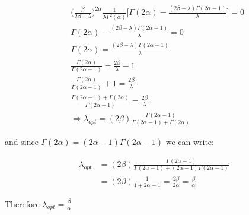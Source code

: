 \documentclass{article}
\begin{document}
\begin{align*}
&\Bigg( \frac{\beta}{ 2 \beta - \lambda} \Bigg)^{2 \alpha} \frac{1}{\lambda \Gamma^{2}(\alpha)} \Bigg[ \Gamma(2 \alpha) - \frac{(2\beta-\lambda)\Gamma(2\alpha-1)}{\lambda} \Bigg] = 0 \\
&\Gamma(2 \alpha) - \frac{(2\beta - \lambda) \Gamma(2 \alpha - 1)}{\lambda} = 0 \\
&\Gamma(2 \alpha) = \frac{(2\beta - \lambda) \Gamma(2 \alpha - 1)}{\lambda} \\
&\frac{\Gamma(2 \alpha)}{\Gamma(2 \alpha - 1)} = \frac{2 \beta}{\lambda} - 1 \\
&\frac{\Gamma(2 \alpha)}{\Gamma(2 \alpha - 1)} + 1 = \frac{2 \beta}{\lambda} \\
&\frac{ \Gamma(2 \alpha - 1) + \Gamma(2 \alpha) }{\Gamma(2 \alpha - 1)} = \frac{2\beta}{\lambda} \\
&\Rightarrow \lambda_{opt} = (2 \beta) \frac{\Gamma(2 \alpha - 1)}{ \Gamma(2 \alpha - 1) + \Gamma(2 \alpha) }
\end{align*}

and since $\Gamma(2 \alpha) = (2 \alpha - 1) \Gamma(2 \alpha - 1)$ we can write:

\begin{align*}
\lambda_{opt} &=  (2 \beta) \frac{\Gamma(2 \alpha - 1)}{ \Gamma(2 \alpha - 1) +  (2 \alpha - 1) \Gamma(2 \alpha - 1) } \\
&= (2 \beta) \frac{1}{1 + 2 \alpha - 1} = \frac{2 \beta}{2 \alpha} = \frac{\beta}{\alpha}
\end{align*}

Therefore $\lambda_{opt} = \frac{\beta}{\alpha}$
\end{document}
